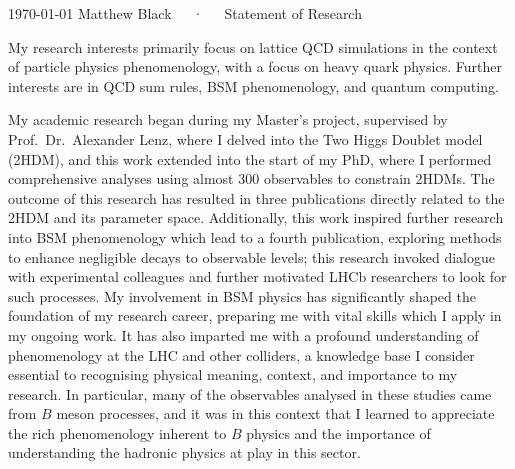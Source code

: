 \documentclass[11pt, a4paper]{awesome-cv}
\begin{document}
\makecvheader[R]

\makecvfooter
  {\today}
  {Matthew Black~~~·~~~Statement of Research}
  {}


\begin{cvletter}

My research interests primarily focus on lattice QCD simulations in the context of particle physics phenomenology, with a focus on heavy quark physics.
Further interests are in QCD sum rules, BSM phenomenology, and quantum computing.

My academic research began during my Master's project, supervised by Prof.~Dr.~Alexander Lenz, where I delved into the Two Higgs Doublet model (2HDM), and this work extended into the start of my PhD, where I performed comprehensive analyses using almost 300 observables to constrain 2HDMs.
The outcome of this research has resulted in three publications directly related to the 2HDM and its parameter space. 
Additionally, this work inspired further research into BSM phenomenology which lead to a fourth publication, exploring methods to enhance negligible decays to observable levels; this research invoked dialogue with experimental colleagues and further motivated LHCb researchers to look for such processes.
My involvement in BSM physics has significantly shaped the foundation of my research career, preparing me with vital skills which I apply in my ongoing work. 
It has also imparted me with a profound understanding of phenomenology at the LHC and other colliders, a knowledge base I consider essential to recognising physical meaning, context, and importance to my research.
In particular, many of the observables analysed in these studies came from $B$ meson processes, and it was in this context that I learned to appreciate the rich phenomenology inherent to $B$ physics and the importance of understanding the hadronic physics at play in this sector.


\end{cvletter}
\end{document}
